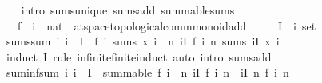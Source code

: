 \begin{isabellebody}
%
\isadelimproof
\ \ %
\endisadelimproof
%
\isatagproof
{}\isamarkupfalse%
\ {\isacharparenleft}{\kern0pt}intro\ sums{\isacharunderscore}{\kern0pt}unique\ sums{\isacharunderscore}{\kern0pt}add\ summable{\isacharunderscore}{\kern0pt}sums{\isacharparenright}{\kern0pt}%
\endisatagproof
{\isafoldproof}%
%
\isadelimproof
\isanewline
%
\endisadelimproof
\isanewline
{}\isamarkupfalse%
\isanewline
\isanewline
{}\isamarkupfalse%
\isanewline
\ \ \ f\ {\isacharcolon}{\kern0pt}{\isacharcolon}{\kern0pt}\ {\isachardoublequoteopen}{\isacharprime}{\kern0pt}i\ {\isasymRightarrow}\ nat\ {\isasymRightarrow}\ {\isacharprime}{\kern0pt}a{\isacharcolon}{\kern0pt}{\isacharcolon}{\kern0pt}{\isacharbraceleft}{\kern0pt}t{}{\isacharunderscore}{\kern0pt}space{\isacharcomma}{\kern0pt}topological{\isacharunderscore}{\kern0pt}comm{\isacharunderscore}{\kern0pt}monoid{\isacharunderscore}{\kern0pt}add{\isacharbraceright}{\kern0pt}{\isachardoublequoteclose}\isanewline
\ \ \ \ \ I\ {\isacharcolon}{\kern0pt}{\isacharcolon}{\kern0pt}\ {\isachardoublequoteopen}{\isacharprime}{\kern0pt}i\ set{\isachardoublequoteclose}\isanewline
{}\isanewline
\isanewline
{}\isamarkupfalse%
\ sums{\isacharunderscore}{\kern0pt}sum{\isacharcolon}{\kern0pt}\ {\isachardoublequoteopen}{\isacharparenleft}{\kern0pt}{\isasymAnd}i{\isachardot}{\kern0pt}\ i\ {\isasymin}\ I\ {\isasymLongrightarrow}\ {\isacharparenleft}{\kern0pt}f\ i{\isacharparenright}{\kern0pt}\ sums\ {\isacharparenleft}{\kern0pt}x\ i{\isacharparenright}{\kern0pt}{\isacharparenright}{\kern0pt}\ {\isasymLongrightarrow}\ {\isacharparenleft}{\kern0pt}{\isasymlambda}n{\isachardot}{\kern0pt}\ {\isasymSum}i{\isasymin}I{\isachardot}{\kern0pt}\ f\ i\ n{\isacharparenright}{\kern0pt}\ sums\ {\isacharparenleft}{\kern0pt}{\isasymSum}i{\isasymin}I{\isachardot}{\kern0pt}\ x\ i{\isacharparenright}{\kern0pt}{\isachardoublequoteclose}\isanewline
%
\isadelimproof
\ \ %
\endisadelimproof
%
\isatagproof
{}\isamarkupfalse%
\ {\isacharparenleft}{\kern0pt}induct\ I\ rule{\isacharcolon}{\kern0pt}\ infinite{\isacharunderscore}{\kern0pt}finite{\isacharunderscore}{\kern0pt}induct{\isacharparenright}{\kern0pt}\ {\isacharparenleft}{\kern0pt}auto\ intro{\isacharbang}{\kern0pt}{\isacharcolon}{\kern0pt}\ sums{\isacharunderscore}{\kern0pt}add{\isacharparenright}{\kern0pt}%
\endisatagproof
{\isafoldproof}%
%
\isadelimproof
\isanewline
%
\endisadelimproof
\isanewline
{}\isamarkupfalse%
\ suminf{\isacharunderscore}{\kern0pt}sum{\isacharcolon}{\kern0pt}\ {\isachardoublequoteopen}{\isacharparenleft}{\kern0pt}{\isasymAnd}i{\isachardot}{\kern0pt}\ i\ {\isasymin}\ I\ {\isasymLongrightarrow}\ summable\ {\isacharparenleft}{\kern0pt}f\ i{\isacharparenright}{\kern0pt}{\isacharparenright}{\kern0pt}\ {\isasymLongrightarrow}\ {\isacharparenleft}{\kern0pt}{\isasymSum}n{\isachardot}{\kern0pt}\ {\isasymSum}i{\isasymin}I{\isachardot}{\kern0pt}\ f\ i\ n{\isacharparenright}{\kern0pt}\ {\isacharequal}{\kern0pt}\ {\isacharparenleft}{\kern0pt}{\isasymSum}i{\isasymin}I{\isachardot}{\kern0pt}\ {\isasymSum}n{\isachardot}{\kern0pt}\ f\ i\ n{\isacharparenright}{\kern0pt}{\isachardoublequoteclose}\isanewline

\end{isabellebody}
